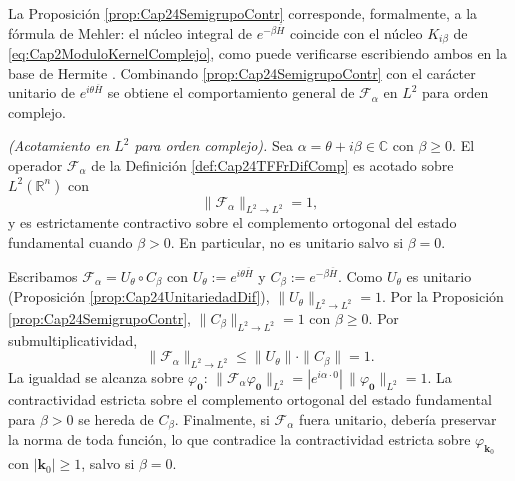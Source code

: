             La Proposición \ref{prop:Cap24SemigrupoContr} corresponde, formalmente, a la fórmula de Mehler: el núcleo integral de $e^{-\beta \overline{H}}$ coincide con el núcleo $K_{i\beta}$ de \eqref{eq:Cap2ModuloKernelComplejo}, como puede verificarse escribiendo ambos en la base de Hermite \citep{folland1989harmonic,thangavelu1993lectures}. Combinando \ref{prop:Cap24SemigrupoContr} con el carácter unitario de $e^{i\theta \overline{H}}$ se obtiene el comportamiento general de $\mathcal{F}_\alpha$ en $L^2$ para orden complejo.

            \begin{proposition}\label{prop:Cap24AcotamientoComp}
                \textit{(Acotamiento en $L^2$ para orden complejo).} Sea $\alpha = \theta + i\beta \in \mathbb{C}$ con $\beta \geq 0$. El operador $\mathcal{F}_\alpha$ de la Definición \ref{def:Cap24TFFrDifComp} es acotado sobre $L^2(\mathbb{R}^n)$ con
                \begin{equation*}
                    \|\mathcal{F}_\alpha\|_{L^2 \to L^2} = 1,
                \end{equation*}
                y es estrictamente contractivo sobre el complemento ortogonal del estado fundamental cuando $\beta > 0$. En particular, no es unitario salvo si $\beta = 0$.
            \end{proposition}
            \begin{Proof}
                Escribamos $\mathcal{F}_\alpha = U_\theta \circ C_\beta$ con $U_\theta := e^{i\theta \overline{H}}$ y $C_\beta := e^{-\beta \overline{H}}$. Como $U_\theta$ es unitario (Proposición \ref{prop:Cap24UnitariedadDif}), $\|U_\theta\|_{L^2 \to L^2} = 1$. Por la Proposición \ref{prop:Cap24SemigrupoContr}, $\|C_\beta\|_{L^2 \to L^2} = 1$ con $\beta \geq 0$. Por submultiplicatividad,
                \begin{equation*}
                    \|\mathcal{F}_\alpha\|_{L^2 \to L^2} \leq \|U_\theta\|\cdot \|C_\beta\| = 1.
                \end{equation*}
                La igualdad se alcanza sobre $\varphi_{\boldsymbol{0}}$: $\|\mathcal{F}_\alpha \varphi_{\boldsymbol{0}}\|_{L^2} = |e^{i\alpha \cdot 0}|\,\|\varphi_{\boldsymbol{0}}\|_{L^2} = 1$. La contractividad estricta sobre el complemento ortogonal del estado fundamental para $\beta > 0$ se hereda de $C_\beta$. Finalmente, si $\mathcal{F}_\alpha$ fuera unitario, debería preservar la norma de toda función, lo que contradice la contractividad estricta sobre $\varphi_{\boldsymbol{k}_0}$ con $|\boldsymbol{k}_0| \geq 1$, salvo si $\beta = 0$.
            \end{Proof}

